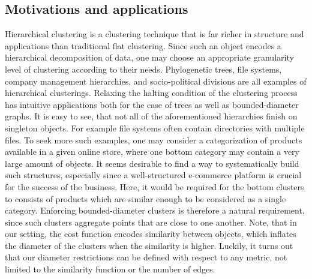 \subsection{Motivations and applications}
Hierarchical clustering is a clustering technique that is far richer in structure and applications than traditional flat clustering. Since such an object encodes a hierarchical decomposition of data, one may choose an appropriate granularity level of clustering according to their needs. 
Phylogenetic trees, file systems, company management hierarchies, and socio-political divisions are all examples of hierarchical clusterings. Relaxing the halting condition of the clustering process has intuitive applications both for the case of trees as well as bounded-diameter graphs. It is easy to see, that not all of the aforementioned hierarchies finish on singleton objects. For example file systems often contain directories with multiple files. To seek more such examples, one may consider a categorization of products available in a given online store, where one bottom category may contain a very large amount of objects. It seems desirable to find a way to systematically build such structures, especially since a well-structured e-commerce platform is crucial for the success of the business. Here, it would be required for the bottom clusters to consists of products which are similar enough to be considered as a single category.
Enforcing bounded-diameter clusters is therefore a natural requirement, since such clusters aggregate points that are close to one another. Note, that in our setting, the cost function encodes similarity between objects, which inflates the diameter of the clusters when the similarity is higher. Luckily, it turns out that our diameter restrictions can be defined with respect to any metric, not limited to the similarity function or the number of edges.

